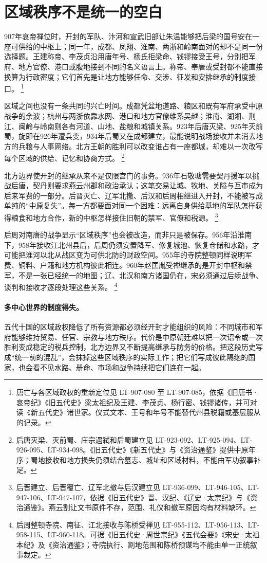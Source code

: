 \section{区域秩序不是统一的空白}
\label{sec:five-dynasties-regional-order}

907年哀帝禅位时，开封的军队、汴河和宣武旧部让朱温能够把后梁的国号安在一座可供给的中枢上；同一年，成都、凤翔、淮南、两浙和岭南面对的却不是同一份选择题。王建称帝、李茂贞沿用唐年号、杨氏拒梁命、钱镠接受王号，分别把军府、地方官僚、港口或腹地接到不同的名义语言上。称帝、奉唐或受封都不能直接换算为行政密度；它们首先是让地方能够任命、交涉、征发和安排继承的制度接口。%
\footnote{唐亡与各区域政权的重新定位见 LT-907-080 至 LT-907-085，依据《旧唐书·哀帝纪》《旧五代史》梁太祖纪及王建、李茂贞、杨行密、钱镠诸传，并可对读《新五代史》诸世家。仪式文本、王号和年号不能替代州县税籍或基层服从的记录。}

区域之间也没有一条共同的兴亡时间。成都凭盆地道路、粮区和既有军府承受中原战争的余波；杭州与两浙依靠水网、港口和地方官僚维系吴越；淮南、湖湘、荆江、闽岭与岭南则各有河道、山地、盐粮和城镇关系。923年后唐灭梁、925年灭前蜀，旋即在926年遭兵变，934年后蜀又在成都建立，最能说明战场接收并未消去地方的兵粮与人事网络。北方王朝的胜利可以改变谁占有一座都城，却难以一次改写每个区域的供给、记忆和协商方式。%
\footnote{后唐灭梁、灭前蜀、庄宗遇弑和后蜀建立见 LT-923-092、LT-925-094、LT-926-095、LT-934-098。《旧五代史》《新五代史》与《资治通鉴》提供中原年序；蜀地接收和地方损失仍须结合墓志、城址和区域材料，不能由军功叙事补足。}

北方边界使开封的继承从来不是仅限宫门的事务。936年石敬瑭需要契丹援军以挑战后唐，契丹则要求燕云州郡和政治承认；这笔交易让城、牧地、关隘与互市成为后来军费的一部分。后晋灭亡、辽军北撤、后汉和后周相继进入开封，不能被写成单纯的“中原复失”。每一方都要面对同一个困难：远离自身供给基地的军队怎样获得粮食和地方合作，新的中枢怎样接住旧朝的禁军、官僚和税源。%
\footnote{后晋建立、后晋覆亡、辽军北撤与后汉建立见 LT-936-099、LT-946-105、LT-947-106、LT-947-107，依据《旧五代史》晋、汉纪、《辽史·太宗纪》与《资治通鉴》。燕云割让文书原件不存，范围、礼仪和撤军原因均有材料缺环。}

后周对南唐的战争显示“区域秩序”也会被改造，而非只是被保存。956年沿淮南下，958年接收江北州县后，后周仍须安置降军、修复城池、恢复仓储和水路，才可能把淮河以北从战区变为可供北防的财政空间。955年的寺院整顿同样说明军费、铜料、户籍和地方机构彼此相连。960年赵匡胤受禅继承的是开封中枢和禁军，不是一张已经统一的地图；辽、北汉和南方诸国仍在，宋必须通过后续战争、谈判和接收才逐段处理这些关系。%
\footnote{后周整顿寺院、南征、江北接收与陈桥受禅见 LT-955-112、LT-956-113、LT-958-115、LT-960-118。可据《旧五代史·周世宗纪》《五代会要》《宋史·太祖本纪》及《资治通鉴》；寺院执行、割地范围和陈桥预谋均不能由单一正统叙事裁定。}

\paragraph{多中心世界的制度得失。}
五代十国的区域政权降低了所有资源都必须经开封才能组织的风险：不同城市和军府能够维持贸易、任官、宗教与地方秩序。代价是中原朝廷难以把一次诏令或一次胜利变成稳定的税兵控制，北方边界又不断提高继承与防务的价格。把这段历史写成“统一前的混乱”，会抹掉这些区域秩序的实际工作；把它们写成彼此隔绝的国家，也会看不见水路、册命、市场和战争持续把它们连在一起。
